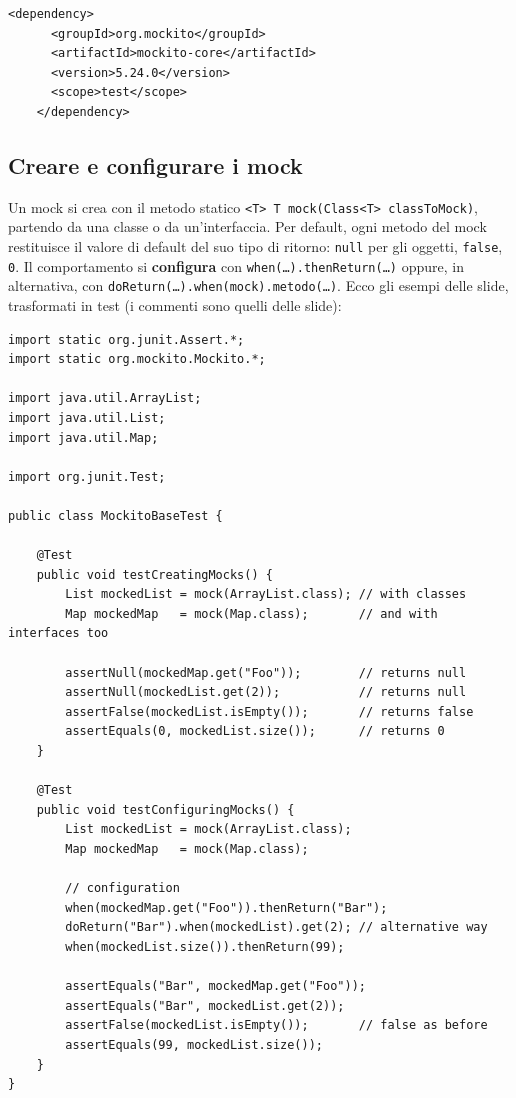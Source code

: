 \begin{lstlisting}[style=xml, name=pom.xml, firstnumber=36]
    <dependency>
      <groupId>org.mockito</groupId>
      <artifactId>mockito-core</artifactId>
      <version>5.24.0</version>
      <scope>test</scope>
    </dependency>
\end{lstlisting}

\subsection{Creare e configurare i mock}

Un mock si crea con il metodo statico \texttt{<T> T mock(Class<T> classToMock)}, partendo da una classe o da
un'interfaccia. Per default, ogni metodo del mock restituisce il valore di default del suo tipo di ritorno:
\texttt{null} per gli oggetti, \texttt{false}, \texttt{0}. Il comportamento si \textbf{configura} con
\texttt{when(\ldots).thenReturn(\ldots)} oppure, in alternativa, con \texttt{doReturn(\ldots).when(mock).metodo(\ldots)}.
Ecco gli esempi delle slide, trasformati in test (i commenti sono quelli delle slide):

\begin{lstlisting}[style=java, name=MockitoBaseTest.java]
import static org.junit.Assert.*;
import static org.mockito.Mockito.*;

import java.util.ArrayList;
import java.util.List;
import java.util.Map;

import org.junit.Test;

public class MockitoBaseTest {

    @Test
    public void testCreatingMocks() {
        List mockedList = mock(ArrayList.class); // with classes
        Map mockedMap   = mock(Map.class);       // and with interfaces too

        assertNull(mockedMap.get("Foo"));        // returns null
        assertNull(mockedList.get(2));           // returns null
        assertFalse(mockedList.isEmpty());       // returns false
        assertEquals(0, mockedList.size());      // returns 0
    }

    @Test
    public void testConfiguringMocks() {
        List mockedList = mock(ArrayList.class);
        Map mockedMap   = mock(Map.class);

        // configuration
        when(mockedMap.get("Foo")).thenReturn("Bar");
        doReturn("Bar").when(mockedList).get(2); // alternative way
        when(mockedList.size()).thenReturn(99);

        assertEquals("Bar", mockedMap.get("Foo"));
        assertEquals("Bar", mockedList.get(2));
        assertFalse(mockedList.isEmpty());       // false as before
        assertEquals(99, mockedList.size());
    }
}
\end{lstlisting}

